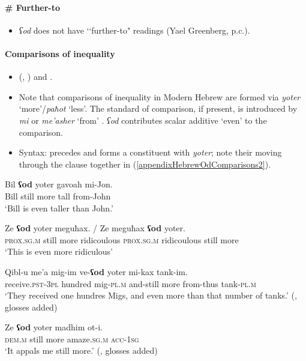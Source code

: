 \paragraph{\# Further-to}
\begin{itemize}
	\item \textit{ʕod} does not have \lq\lq further-to" readings (Yael Greenberg, p.c.).
\end{itemize}
		
\paragraph{Comparisons of inequality }\label{appendixHebrewOdComparisons}
\begin{itemize}
	\sloppy
	\item \citeauthor{Glinert1976} (\citeyear{Glinert1976}, \citeyear[220]{Glinert1989})
and \textcite{MiashkurGreenberg}.
	\item Note that comparisons of inequality in Modern Hebrew are formed via \textit{yoter} \lq more'\slash \textit{paħot} \lq less'. The standard of comparison, if present, is introduced by \textit{mi} or \textit{me\rq{}asher} \lq from' \parencite[216–217]{Glinert1989}. \textit{ʕod} contributes scalar additive \lq even\rq{ }to the comparison.
	\item Syntax: precedes and forms a constituent with \textit{yoter}; note their moving through the clause together in (\ref{appendixHebrewOdComparisons2}).
\end{itemize}	
\begin{exe}
	\ex
	\gll Bil \textbf{ʕod} yoter gavoah mi-Jon.\\
	Bill still more tall from-John\\
	\glt \lq Bill is even taller than John.' \parencite[1]{MiashkurGreenberg}
	
	\ex\label{appendixHebrewOdComparisons2}
	\gll Ze \textbf{ʕod} yoter meguħax. \textup{/} Ze meguħax \textbf{ʕod} yoter.\\
	\textsc{prox}.\textsc{sg}.\textsc{m} still more ridicoulous {} \textsc{prox}.\textsc{sg}.\textsc{m} ridicoulous still more\\
	\glt \lq This is even more ridiculous\rq{ }\parencite[251–252]{Glinert1976}
		
	
	\ex
	\gll Qibl-u me\rq{}a mig-im ve-\textbf{ʕod} yoter mi-kax tank-im.\\
	receive.\textsc{pst}-3\textsc{pl} hundred mig-\textsc{pl}.\textsc{m} and-still more from-thus tank-\textsc{pl}.\textsc{m}\\
	\glt \lq They received one hundres Migs, and even more than that number of tanks.' (\cite[59]{Glinert1989}, glosses added)	
	
	\ex
	\gll Ze \textbf{ʕod} yoter madhim ot-i.\\
	\textsc{dem}.\textsc{m} still more amaze.\textsc{sg}.\textsc{m} \textsc{acc}-1\textsc{sg}\\
	\glt \lq It appals me still more.' (\cite[220]{Glinert1989}, glosses added)	
\end{exe}
	
